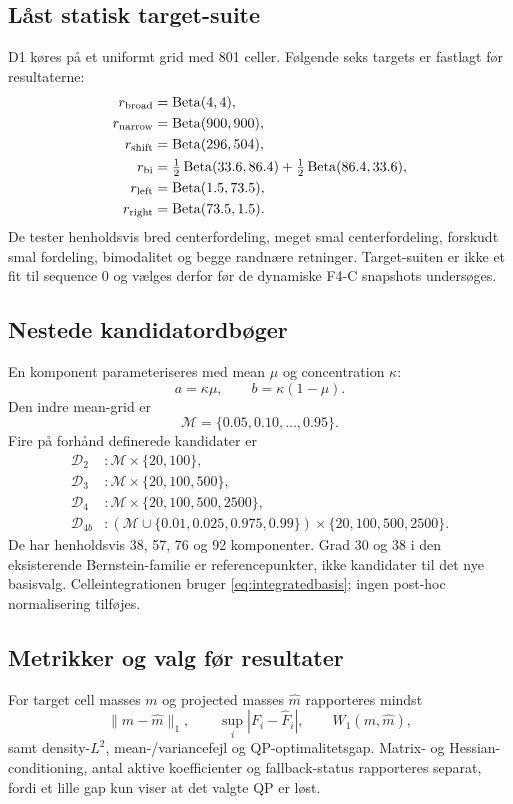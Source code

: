\subsection{Låst statisk target-suite}
D1 køres på et uniformt grid med 801 celler. Følgende seks targets er fastlagt
før resultaterne:
\begin{align}
 r_{\rm broad} &= \operatorname{Beta}(4,4),\\
 r_{\rm narrow} &= \operatorname{Beta}(900,900),\\
 r_{\rm shift} &= \operatorname{Beta}(296,504),\\
 r_{\rm bi} &= \tfrac12\operatorname{Beta}(33.6,86.4)+\tfrac12\operatorname{Beta}(86.4,33.6),\\
 r_{\rm left} &= \operatorname{Beta}(1.5,73.5),\\
 r_{\rm right} &= \operatorname{Beta}(73.5,1.5).
\end{align}
De tester henholdsvis bred centerfordeling, meget smal centerfordeling,
forskudt smal fordeling, bimodalitet og begge randnære retninger. Target-suiten
er ikke et fit til sequence 0 og vælges derfor før de dynamiske F4-C snapshots
undersøges.

\subsection{Nestede kandidatordbøger}
En komponent parameteriseres med mean \(\mu\) og concentration \(\kappa\):
\[
 a=\kappa\mu,\qquad b=\kappa(1-\mu).
\]
Den indre mean-grid er
\[
 \mathcal M=\{0.05,0.10,\ldots,0.95\}.
\]
Fire på forhånd definerede kandidater er
\begin{align}
 \mathcal D_2 &: \mathcal M\times\{20,100\},\\
 \mathcal D_3 &: \mathcal M\times\{20,100,500\},\\
 \mathcal D_4 &: \mathcal M\times\{20,100,500,2500\},\\
 \mathcal D_{4b} &: (\mathcal M\cup\{0.01,0.025,0.975,0.99\})
                    \times\{20,100,500,2500\}.
\end{align}
De har henholdsvis 38, 57, 76 og 92 komponenter. Grad 30 og 38 i den
eksisterende Bernstein-familie er referencepunkter, ikke kandidater til det
nye basisvalg. Celleintegrationen bruger \eqref{eq:integratedbasis}; ingen
post-hoc normalisering tilføjes.

\subsection{Metrikker og valg før resultater}
For target cell masses \(m\) og projected masses \(\hat m\) rapporteres mindst
\[
 \|m-\hat m\|_1,\qquad
 \sup_i|F_i-\hat F_i|,\qquad
 W_1(m,\hat m),
\]
samt density-\(L^2\), mean-/variancefejl og QP-optimalitetsgap. Matrix- og
Hessian-conditioning, antal aktive koefficienter og fallback-status rapporteres
separat, fordi et lille gap kun viser at det valgte QP er løst.

